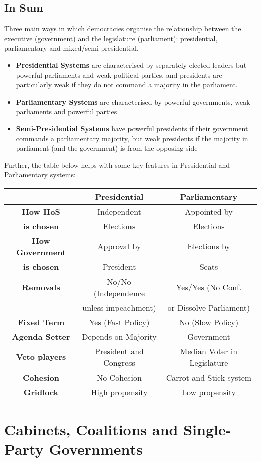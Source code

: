 \documentclass[12pt, letterpaper]{article}
\begin{document}
\subsection{In Sum}
Three main ways in which democracies organise the relationship between the executive (government) and the legislature (parliament): presidential, parliamentary and mixed/semi-presidential.
\begin{itemize}
	\item \textbf{Presidential Systems} are characterised by separately elected leaders but powerful parliaments and weak political parties, and presidents are particularly weak if they do not command a majority in the parliament.
	\item \textbf{Parliamentary Systems} are characterised by powerful governments, weak parliaments and powerful parties
	\item \textbf{Semi-Presidential Systems} have powerful presidents if their government commands a parliamentary majority, but weak presidents if the majority in parliament (and the government) is from the opposing side
\end{itemize}
Further, the table below helps with some key features in Presidential and Parliamentary systems:
\begin{center}
	\begin{tabular}{c|c|c}
		& Presidential & Parliamentary\\
		\hline
		\textbf{How HoS} & Independent & Appointed by\\
		\textbf{is chosen} & Elections & Elections\\
		\textbf{How Government} & Approval by & Elections by\\
		\textbf{is chosen} & President & Seats\\
		\textbf{Removals} & No/No (Independence & Yes/Yes (No Conf.\\
			 & unless impeachment) & or Dissolve Parliament)\\
		\textbf{Fixed Term} & Yes (Fast Policy) & No (Slow Policy)\\
		\textbf{Agenda Setter} & Depends on Majority & Government\\
		\textbf{Veto players} & President and Congress & Median Voter in Legislature\\
		\textbf{Cohesion} & No Cohesion & Carrot and Stick system\\
		\textbf{Gridlock} & High propensity & Low propensity
	\end{tabular}
\end{center}

\newpage
\section{Cabinets, Coalitions and Single-Party Governments}
\end{document}
